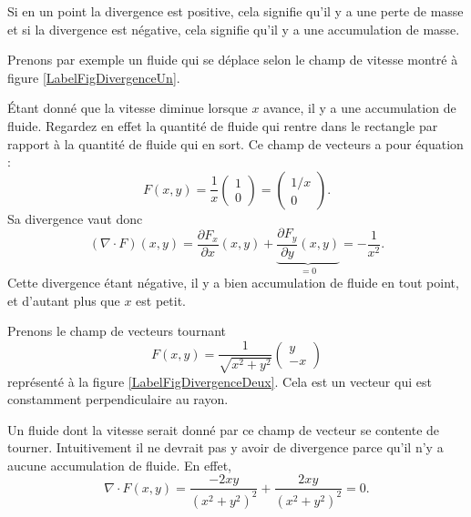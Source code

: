 Si en un point la divergence est positive, cela signifie qu'il y a une perte de masse et si la divergence est négative, cela signifie qu'il y a une accumulation de masse.

Prenons par exemple un fluide qui se déplace selon le champ de vitesse montré à figure \ref{LabelFigDivergenceUn}.
\newcommand{\CaptionFigDivergenceUn}{Le champ de vecteurs $F(x,y)=\frac{1}{ x }(1,0)$.}


Étant donné que la vitesse diminue lorsque $x$ avance, il y a une accumulation de fluide. Regardez en effet la quantité de fluide qui rentre dans le rectangle par rapport à la quantité de fluide qui en sort. Ce champ de vecteurs a pour équation :
\begin{equation}
    F(x,y)=\frac{1}{ x }\begin{pmatrix}
        1    \\ 
        0    
    \end{pmatrix}=\begin{pmatrix}
        1/x    \\ 
        0    
    \end{pmatrix}.
\end{equation}
Sa divergence vaut donc
\begin{equation}
    (\nabla\cdot F)(x,y)=\frac{ \partial F_x }{ \partial x }(x,y)+\underbrace{\frac{ \partial F_y }{ \partial y }(x,y)}_{=0}=-\frac{1}{ x^2 }.
\end{equation}
Cette divergence étant négative, il y a bien accumulation de fluide en tout point, et d'autant plus que $x$ est petit.

\begin{example}     \label{ExamDivFrot}

    Prenons le champ de vecteurs tournant
    \begin{equation}
        F(x,y)=\frac{1}{ \sqrt{x^2+y^2} }\begin{pmatrix}
            y    \\ 
            -x    
        \end{pmatrix}
    \end{equation}
    représenté à la figure \ref{LabelFigDivergenceDeux}. Cela est un vecteur qui est constamment perpendiculaire au rayon.

    \newcommand{\CaptionFigDivergenceDeux}{Le champ de vecteurs $F(x,y)=(y,-x)$.}
    

    Un fluide dont la vitesse serait donné par ce champ de vecteur se contente de tourner. Intuitivement il ne devrait pas y avoir de divergence parce qu'il n'y a aucune accumulation de fluide. En effet,
    \begin{equation}
        \nabla\cdot F(x,y)=\frac{ -2xy }{ (x^2+y^2)^2 }+\frac{ 2xy }{ (x^2+y^2)^2 }=0.
    \end{equation}
\end{example}

